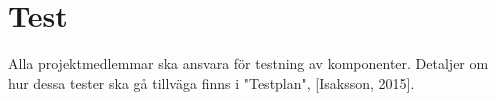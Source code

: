 \section{Test}
Alla projektmedlemmar ska ansvara för testning av komponenter. Detaljer om hur dessa tester ska gå tillväga finns i "Testplan", [Isaksson, 2015].
